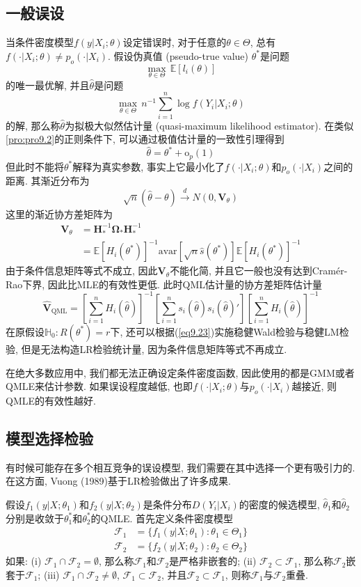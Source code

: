 \documentclass[cn, 12pt, math=mtpro2, bibstyle=apa, blue, twocol]{elegantbook}
\newcommand{\E}{\mathbb{E}}
\newcommand{\HH}{\mathbb{H}}
\newcommand{\V}{\mathbold{V}}
\newcommand{\BO}{\mathbold{\Omega}}
\newcommand{\hth}{\hat{\theta}}
\begin{document}
\subsection{一般误设}
当条件密度模型$f(y|X_i;\theta)$设定错误时, 对于任意的$\theta\in\Theta$, 总有$f(\cdot|X_i;\theta)\neq p_o(\cdot|X_i)$. 假设伪真值 (pseudo-true value) $\theta^\ast$是问题
$$\max_{\theta\in\Theta}\,\E[l_i(\theta)]$$
的唯一最优解, 并且$\hat{\theta}$是问题
$$\max_{\theta\in\Theta}\,n^{-1}\sum_{i=1}^{n}\log f(Y_i|X_i;\theta)$$
的解, 那么称$\hth$为拟极大似然估计量 (quasi-maximum likelihood estimator). 在类似\ref{pro:pro9.2}的正则条件下, 可以通过极值估计量的一致性引理得到
$$\hat{\theta}=\theta^\ast+\text{o}_p(1)$$
但此时不能将$\theta^\ast$解释为真实参数, 事实上它最小化了$f(\cdot|X_i;\theta)$和$p_o(\cdot|X_i)$之间的距离. 其渐近分布为
$$\sqrt{n}(\hat{\theta}-\theta)\xrightarrow{d} N(0,\V_\theta)$$
这里的渐近协方差矩阵为
\begin{align*}
\V_\theta&=\mathbold{H}_\ast^{-1}\BO_\ast\mathbold{H}_\ast^{-1} \\
&=\E[H_i(\theta^\ast)]^{-1}\text{avar}[\sqrt{n}\hat{s}(\theta^\ast)]\E[H_i(\theta^\ast)]^{-1}
\end{align*}
由于条件信息矩阵等式不成立, 因此$\V_\theta$不能化简, 并且它一般也没有达到Cramér-Rao下界, 因此比MLE的有效性更低. 此时QML估计量的协方差矩阵估计量
\begin{equation}\label{eq9.23}
  \hat{\V}_{\text{QML}}=\left[\sum_{i=1}^{n}H_i(\hth)\right]^{-1}\left[\sum_{i=1}^{n}s_i(\hth)s_i(\hth)'\right]\left[\sum_{i=1}^{n}H_i(\hth)\right]^{-1}
\end{equation}
在原假设$\HH_0:R(\theta^\ast)=r$下, 还可以根据(\ref{eq9.23})实施稳健Wald检验与稳健LM检验, 但是无法构造LR检验统计量, 因为条件信息矩阵等式不再成立.

在绝大多数应用中, 我们都无法正确设定条件密度函数, 因此使用的都是GMM或者QMLE来估计参数. 如果误设程度越低, 也即$f(\cdot|X_i;\theta)$与$p_o(\cdot|X_i)$越接近, 则QMLE的有效性越好.
\subsection{模型选择检验}
有时候可能存在多个相互竞争的误设模型, 我们需要在其中选择一个更有吸引力的. 在这方面, Vuong (1989)基于LR检验做出了许多成果.

假设$f_1(y|X;\theta_1)$和$f_2(y|X;\theta_2)$是条件分布$D(Y_i|X_i)$的密度的候选模型, $\hat{\theta}_1$和$\hat{\theta}_2$分别是收敛于$\theta_1^\ast$和$\theta_2^\ast$的QMLE. 首先定义条件密度模型
\begin{align*}
\mathscr{F}_1&=\{f_1(y|X;\theta_1): \theta_1\in\Theta_1\} \\
\mathscr{F}_2&=\{f_2(y|X;\theta_2): \theta_2\in\Theta_2\}
\end{align*}
如果: (i) $\mathscr{F}_1\cap \mathscr{F}_2=\emptyset$, 那么称$\mathscr{F}_1$和$\mathscr{F}_2$是严格非嵌套的; (ii) $\mathscr{F}_2\subset\mathscr{F}_1$, 那么称$\mathscr{F}_2$嵌套于$\mathscr{F}_1$; (iii) $\mathscr{F}_1\cap \mathscr{F}_2\neq\emptyset$, $\mathscr{F}_1\subset\mathscr{F}_2$, 并且$\mathscr{F}_2\subset\mathscr{F}_1$, 则称$\mathscr{F}_1$与$\mathscr{F}_2$重叠.
\end{document}
